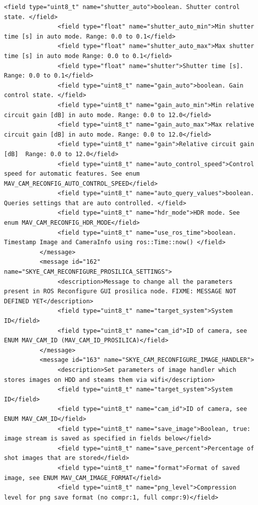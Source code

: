 \begin{lstlisting}[captionpos=b, caption="Definition of \textsc{Skye} specific Mavlink messages", label=app_xml]
               <field type="uint8_t" name="shutter_auto">boolean. Shutter control state. </field>
               <field type="float" name="shutter_auto_min">Min shutter time [s] in auto mode. Range: 0.0 to 0.1</field>
               <field type="float" name="shutter_auto_max">Max shutter time [s] in auto mode Range: 0.0 to 0.1</field>
               <field type="float" name="shutter">Shutter time [s]. Range: 0.0 to 0.1</field>
               <field type="uint8_t" name="gain_auto">boolean. Gain control state. </field>
               <field type="uint8_t" name="gain_auto_min">Min relative circuit gain [dB] in auto mode. Range: 0.0 to 12.0</field>
               <field type="uint8_t" name="gain_auto_max">Max relative circuit gain [dB] in auto mode. Range: 0.0 to 12.0</field>
               <field type="uint8_t" name="gain">Relative circuit gain [dB]  Range: 0.0 to 12.0</field>
               <field type="uint8_t" name="auto_control_speed">Control speed for automatic features. See enum MAV_CAM_RECONFIG_AUTO_CONTROL_SPEED</field>
               <field type="uint8_t" name="auto_query_values">boolean. Queries settings that are auto controlled. </field>
               <field type="uint8_t" name="hdr_mode">HDR mode. See enum MAV_CAM_RECONFIG_HDR_MODE</field>
               <field type="uint8_t" name="use_ros_time">boolean. Timestamp Image and CameraInfo using ros::Time::now() </field>
          </message>
          <message id="162" name="SKYE_CAM_RECONFIGURE_PROSILICA_SETTINGS">
               <description>Message to change all the parameters present in ROS Reconfigure GUI prosilica node. FIXME: MESSAGE NOT DEFINED YET</description>
               <field type="uint8_t" name="target_system">System ID</field>
               <field type="uint8_t" name="cam_id">ID of camera, see ENUM MAV_CAM_ID (MAV_CAM_ID_PROSILICA)</field>
          </message>
          <message id="163" name="SKYE_CAM_RECONFIGURE_IMAGE_HANDLER">
               <description>Set parameters of image handler which stores images on HDD and steams them via wifi</description>
               <field type="uint8_t" name="target_system">System ID</field>
               <field type="uint8_t" name="cam_id">ID of camera, see ENUM MAV_CAM_ID</field>
               <field type="uint8_t" name="save_image">Boolean, true: image stream is saved as specified in fields below</field>
               <field type="uint8_t" name="save_percent">Percentage of shot images that are stored</field>
               <field type="uint8_t" name="format">Format of saved image, see ENUM MAV_CAM_IMAGE_FORMAT</field>
               <field type="uint8_t" name="png_level">Compression level for png save format (no compr:1, full compr:9)</field>

\end{lstlisting}
